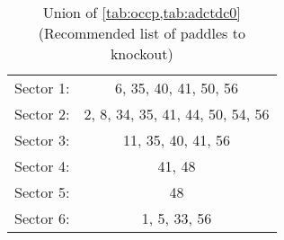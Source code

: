 \begin{table}
\begin{minipage}{\textwidth}
\begin{center}
\begin{singlespacing}

\caption{\label{tab:tofko}Union of \ref{tab:occp,tab:adctdc0} (Recommended list of paddles to knockout)}

\begin{tabular}{lc}

\hline \hline

Sector 1: & 6, 35, 40, 41, 50, 56\\
Sector 2: & 2, 8, 34, 35, 41, 44, 50, 54, 56\\
Sector 3: & 11, 35, 40, 41, 56\\
Sector 4: & 41, 48 \\
Sector 5: & 48\\
Sector 6: & 1, 5, 33, 56 \\

\hline \hline

\end{tabular}

\end{singlespacing}
\end{center}
\end{minipage}
\end{table}

